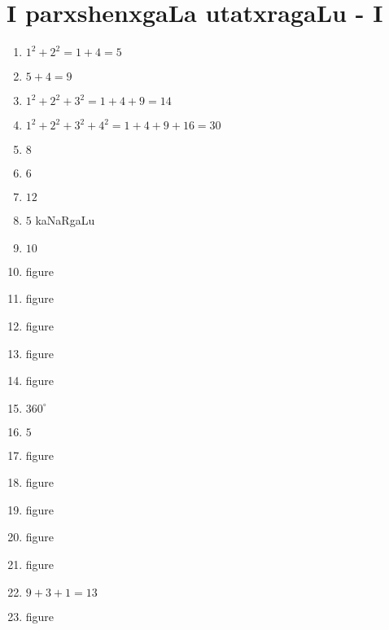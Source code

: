 \chapter{I parxshenxgaLa utatxragaLu - I}

\begin{enumerate}
 \renewcommand{\labelenumi}{\rm(\theenumi)}
\item $1^2+ 2^2 = 1+4=5$

\item $5+4=9$

\item $1^2+2^2+3^2 = 1+4+9 =14$

\item $1^2 + 2^2 + 3^2+4^2 = 1+4+9+16 = 30$

\item $8$

\item $6$

\item $12$

\item $5$ kaNaRgaLu

\item $10$

\item {\rm figure}

\item {\rm figure}

\item {\rm figure}

\item {\rm figure}

\item {\rm figure}

\item $360^{\circ}$

\item $5$

\item {\rm figure}

\item {\rm figure}

\item {\rm figure}

\item {\rm figure}

\item {\rm figure}

\item $9+3+1=13$

\item {\rm figure}


\end{enumerate}
